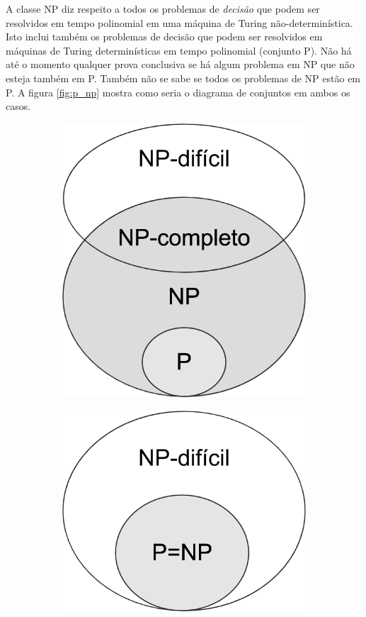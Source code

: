 \documentclass[a4paper,12pt,oneside,onecolumn]{uerj}
\begin{document}
A classe NP diz respeito a todos os problemas de \emph{decisão} que podem ser resolvidos em tempo polinomial em uma máquina de Turing não-determinística. Isto inclui também os problemas de decisão que podem ser resolvidos em máquinas de Turing determinísticas em tempo polinomial (conjunto P). Não há até o momento qualquer prova conclusiva se há algum problema em NP que não esteja também em P. Também não se sabe se todos os problemas de NP estão em P. A figura \ref{fig:p_np} mostra como seria o diagrama de conjuntos em ambos os casos.


\begin{figure}[ht]
\centering
\begin{subfigure}{.5\textwidth}
  \centering
  \includegraphics[scale=0.3]{figures/p_neq_np.png}
\end{subfigure}%
\begin{subfigure}{.5\textwidth}
  \centering
  \includegraphics[scale=0.3]{figures/p_eq_np.png}

\end{subfigure}
\end{figure}
\end{document}
